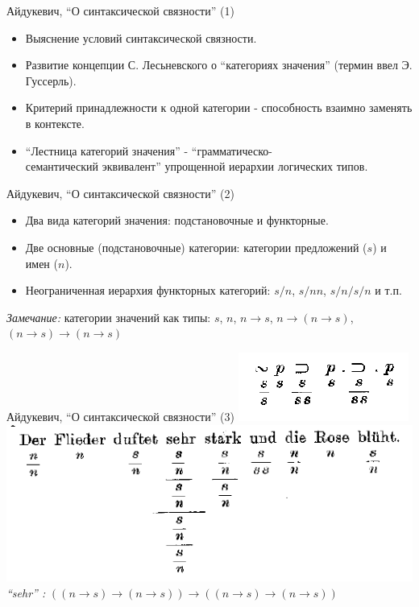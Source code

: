 \documentclass{beamer}
\begin{document}
\begin{frame}{Айдукевич, ``О синтаксической связности'' (1)}
\begin{itemize}
  \item Выяснение условий синтаксической связности.
  \item Развитие концепции С. Лесьневского о ``категориях значения'' (термин ввел Э. Гуссерль).
  \item Критерий принадлежности к одной категории - способность взаимно заменять в контексте.
  \item ``Лестница категорий значения'' - ``грамматическо-\\семантический эквивалент'' упрощенной иерархии логических типов.
\end{itemize}
\end{frame}

\begin{frame}{Айдукевич, ``О синтаксической связности'' (2)}
\begin{itemize}
  \item Два вида категорий значения: подстановочные и функторные.
  \item Две основные (подстановочные) категории: категории предложений ($s$) и имен ($n$).
  \item Неограниченная иерархия функторных категорий: $s/n$, $s/nn$, $s/n/s/n$  и т.п.
\end{itemize}
\bigskip
\textit{Замечание:} категории значений как типы: $s$, $n$, $n \to s$, $n \to (n \to s)$, $(n \to s) \to (n \to s)$
\end{frame}

\begin{frame}{Айдукевич, ``О синтаксической связности'' (3)}
\includegraphics[scale=0.50]{ajdukiewicz2.png}\\
\bigskip
\includegraphics[scale=0.50]{ajdukiewicz1.png}\\
\bigskip
\textit{``sehr'' :} $((n \to s) \to (n \to s)) \to ((n \to s) \to (n \to s))$
\end{frame}
\end{document}
